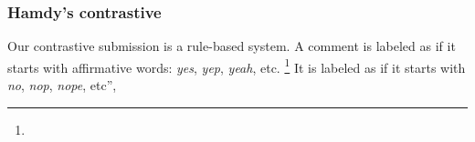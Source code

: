 \subsubsection{Hamdy's contrastive}

Our contrastive submission  is a rule-based system. A comment is 
labeled as \yes if it starts with affirmative words: \textit{yes}, 
\textit{yep}, \textit{yeah}, etc.%
\footnote{}
It is labeled as \no if it starts with \textit{no}, \textit{nop}, 
\textit{nope}, etc”, 

